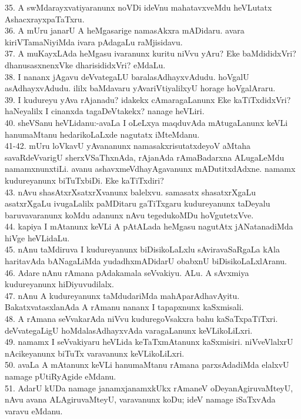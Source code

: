 \documentclass{article}
\begin{document}
35. A swMdarayxvatiyaranunx noVDi ideVnu mahatavxveMdu heVLutatx AshacxrayxpaTaTxru.\\
36. A mUru janarU A heMgasarige namasAkxra mADidaru. avara kiriVTamaNiyiMda ivara pAdagaLu raMjisidavu.\\
37. A muKayxLAda heMgasu ivaranunx kuritu niVvu yAru? Eke baMdididxVri? dhanusasxnenxVke dharisididxVri? eMdaLu.\\
38. I nananx jAgavu deVvategaLU baralasAdhayxvAdudu. hoVgalU asAdhayxvAdudu. ililx baMdavaru yAvariVtiyalilxyU horage hoVgalAraru.\\
39. I kudureyu yAva rAjanadu? idakekx cAmaragaLanunx Eke kaTiTxdidxVri? haNeyalilx I cinanxda tagaDeVtakekx? nanage heVLiri.\\
40. sheVSanu heVLidanu:-avaLa I oLeLxya maqduvAda mAtugaLanunx keVLi hanumaMtanu hedarikoLaLxde nagutatx iMteMdanu.\\
41-42. mUru loVkavU yAvananunx namasakxrisutatxdeyoV aMtaha savaRdeVvarigU sherxVSaThxnAda, rAjanAda rAmaBadarxna ALugaLeMdu namamxnunxtiLi. avanu ashavxmeVdhayAgavanunx mADutitxdAdxne. namamx kudureyanunx biTuTxbiDi. Eke kaTiTxdiri?\\
43. nAvu shasAtxrXsatxrXvanunx balelxvu. samasatx shasatxrXgaLu asatxrXgaLu ivugaLalilx paMDitaru gaTiTxgaru kudureyanunx taDeyalu baruvavaranunx koMdu adanunx nAvu tegedukoMDu hoVgutetxVve.\\
44. kapiya I mAtanunx keVLi A pAtALada heMgasu nagutAtx jANatanadiMda hiVge heVLidaLu.\\
45. nAnu taMdiruva I kudureyanunx biDisikoLaLxlu sAviravaSaRgaLa kAla haritavAda bANagaLiMda yudadhxmADidarU obabxnU biDisikoLaLxlAranu.\\
46. Adare nAnu rAmana pAdakamala seVvakiyu. ALu. A sAvxmiya kudureyanunx hiDiyuvudilalx.\\
47. nAnu A kudureyanunx taMdudariMda mahAparAdhavAyitu. BakatxvatasxlanAda A rAmanu nananx I tapapxnunx kaSxmisali.\\
48. A rAmana seVvakarAda niVvu kuduregoVsakxra bahu kaSaTxpaTiTxri. deVvategaLigU hoMdalasAdhayxvAda varagaLanunx keVLikoLiLxri.\\
49. namamx I seVvakiyaru heVLida keTaTxmAtanunx kaSxmisiri. niVveVlalxrU nAcikeyanunx biTuTx varavanunx keVLikoLiLxri.\\
50. avaLa A mAtanunx keVLi hanumaMtanu rAmana parxsAdadiMda elalxvU namage pUtiRyAgide eMdanu.\\
51. AdarU kUDa namage janamxjanamxkUkx rAmaneV oDeyanAgiruvaMteyU, nAvu avana ALAgiruvaMteyU, varavanunx koDu; ideV namage iSaTxvAda varavu eMdanu.\\
\end{document}
